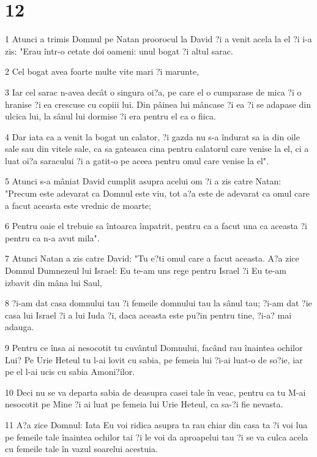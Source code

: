 \chapter{12}

\par 1 Atunci a trimis Domnul pe Natan proorocul la David ?i a venit acela la el ?i i-a zis: "Erau într-o cetate doi oameni: unul bogat ?i altul sarac.
\par 2 Cel bogat avea foarte multe vite mari ?i marunte,
\par 3 Iar cel sarac n-avea decât o singura oi?a, pe care el o cumparase de mica ?i o hranise ?i ea crescuse cu copiii lui. Din pâinea lui mâncase ?i ea ?i se adapase din ulcica lui, la sânul lui dormise ?i era pentru el ca o fiica.
\par 4 Dar iata ca a venit la bogat un calator, ?i gazda nu s-a îndurat sa ia din oile sale sau din vitele sale, ca sa gateasca cina pentru calatorul care venise la el, ci a luat oi?a saracului ?i a gatit-o pe aceea pentru omul care venise la el".
\par 5 Atunci s-a mâniat David cumplit asupra acelui om ?i a zis catre Natan: "Precum este adevarat ca Domnul este viu, tot a?a este de adevarat ca omul care a facut aceasta este vrednic de moarte;
\par 6 Pentru oaie el trebuie sa întoarca împatrit, pentru ca a facut una ca aceasta ?i pentru ca n-a avut mila".
\par 7 Atunci Natan a zis catre David: "Tu e?ti omul care a facut aceasta. A?a zice Domnul Dumnezeul lui Israel: Eu te-am uns rege pentru Israel ?i Eu te-am izbavit din mâna lui Saul,
\par 8 ?i-am dat casa domnului tau ?i femeile domnului tau la sânul tau; ?i-am dat ?ie casa lui Israel ?i a lui Iuda ?i, daca aceasta este pu?in pentru tine, ?i-a? mai adauga.
\par 9 Pentru ce însa ai nesocotit tu cuvântul Domnului, facând rau înaintea ochilor Lui? Pe Urie Heteul tu l-ai lovit cu sabia, pe femeia lui ?i-ai luat-o de so?ie, iar pe el l-ai ucis cu sabia Amoni?ilor.
\par 10 Deci nu se va departa sabia de deasupra casei tale în veac, pentru ca tu M-ai nesocotit pe Mine ?i ai luat pe femeia lui Urie Heteul, ca sa-?i fie nevasta.
\par 11 A?a zice Domnul: Iata Eu voi ridica asupra ta rau chiar din casa ta ?i voi lua pe femeile tale înaintea ochilor tai ?i le voi da aproapelui tau ?i se va culca acela cu femeile tale în vazul soarelui acestuia.
